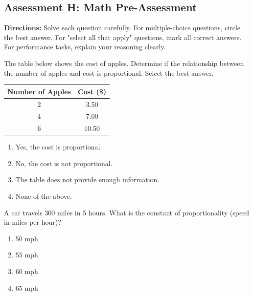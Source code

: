 \documentclass[12pt]{article}
\begin{document}
\subsection*{Assessment H: Math Pre-Assessment}
\onehalfspacing

\begin{tcolorbox}[colframe=black!50, colback=white, title=Assessment Directions]
\textbf{Directions:} Solve each question carefully. For multiple-choice questions, circle the best answer. For "select all that apply" questions, mark all correct answers. For performance tasks, explain your reasoning clearly.
\end{tcolorbox}

\begin{tcolorbox}[colframe=black!50, colback=white, title=\textbf{Problem 1 (7.RP.A.2a)}]
The table below shows the cost of apples. Determine if the relationship between the number of apples and cost is proportional. Select the best answer.\\

\begin{center}
\begin{tabular}{|c|c|}
\hline
Number of Apples & Cost (\$) \\
\hline
2 & 3.50 \\
4 & 7.00 \\
6 & 10.50 \\
\hline
\end{tabular}
\end{center}

\begin{enumerate}[label=(\Alph*)]
    \item Yes, the cost is proportional.
    \item No, the cost is not proportional.
    \item The table does not provide enough information.
    \item None of the above.
\end{enumerate}
\end{tcolorbox}

\begin{tcolorbox}[colframe=black!50, colback=white, title=\textbf{Problem 2 (7.RP.A.2b)}]
A car travels 300 miles in 5 hours. What is the constant of proportionality (speed in miles per hour)?

\begin{enumerate}[label=(\Alph*)]
    \item 50 mph
    \item 55 mph
    \item 60 mph
    \item 65 mph
\end{enumerate}
\end{tcolorbox}
\end{document}
